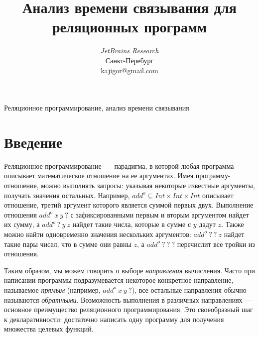 \documentclass[conference]{IEEEtran}
\begin{document}
\newcommand{\miniKanren}{\textsc{miniKanren}}
\newcommand{\mercury}{\textsc{Mercury}}
\newcommand{\haskell}{\textsc{Haskell}}
\newcommand{\prolog}{\textsc{Prolog}}
\newcommand{\scheme}{\textsc{Scheme}}


\title{Анализ времени связывания для реляционных программ}

\author{
\and
{}
\textit{JetBrains Research}\\
Санкт-Перебург \\
kajigor@gmail.com}


\maketitle

\begin{abstract}
    
\end{abstract}

\begin{IEEEkeywords}
Реляционное программирование, анализ времени связывания
\end{IEEEkeywords}

\section{Введение}

Реляционное программирование~--- парадигма, в которой любая программа описывает математическое отношение на ее аргументах. 
Имея программу-отношение, можно выполнять запросы: указывая некоторые известные аргументы, получать значения остальных.
Например, $add^o \subseteq Int \times Int \times Int$ описывает отношение, третий аргумент которого является суммой первых двух. 
Выполнение отношения $add^o  \ x \ y \ ?$ с зафиксированными первым и вторым аргументом найдет их сумму, а $add^o \ ? \ y \ z$ найдет такие числа, которые в сумме с $y$ дадут $z$. 
Также можно найти одновременно значения нескольких аргументов: $add^o \ ? \ ? \ z$ найдет такие пары чисел, что в сумме они равны $z$, а $add^o \ ? \ ? \ ?$ перечислит все тройки из отношения. 

Таким образом, мы можем говорить о выборе \emph{направления} вычисления. 
Часто при написании программы подразумевается некоторое конкретное направление, называемое \emph{прямым} (например, $add^o  \ x \ y \ ?$), все остальные направления обычно называются \emph{обратными}. 
Возможность выполнения в различных направлениях --- основное преимущество реляционного программирования. 
Это своеобразный шаг к декларативности: достаточно написать одну программу для получения множества целевых функций. 
\end{document}
